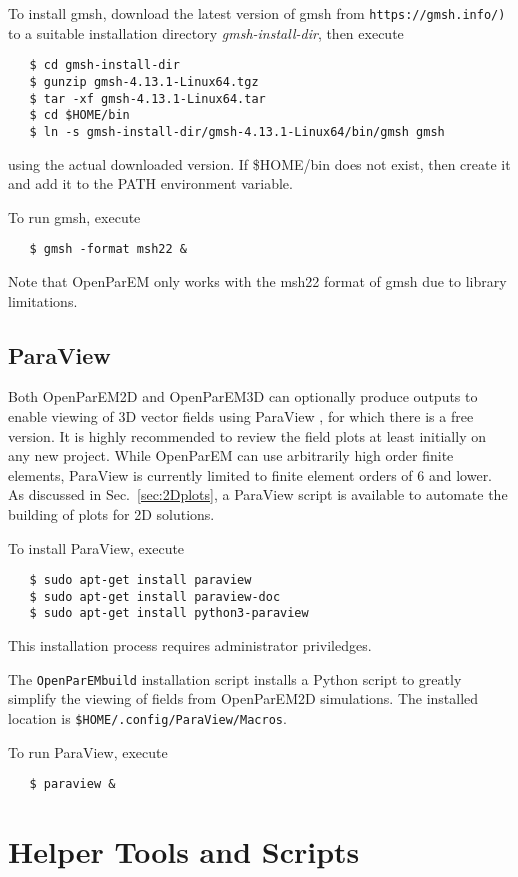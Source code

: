\documentclass[titlepage]{article}
\renewcommand\_{\textunderscore\linebreak[1]}
\begin{document}
To install gmsh, download the latest version of gmsh from \verb+https://gmsh.info/)+ to a suitable installation directory \textit{gmsh-install-dir},  then execute
\begin{verbatim}
   $ cd gmsh-install-dir
   $ gunzip gmsh-4.13.1-Linux64.tgz
   $ tar -xf gmsh-4.13.1-Linux64.tar
   $ cd $HOME/bin
   $ ln -s gmsh-install-dir/gmsh-4.13.1-Linux64/bin/gmsh gmsh
\end{verbatim}
using the actual downloaded version.  If \$HOME/bin does not exist, then create it and add it to the PATH environment variable.

To run gmsh, execute
\begin{verbatim}
   $ gmsh -format msh22 &
\end{verbatim}

\noindent Note that OpenParEM only works with the msh22 format of gmsh due to library limitations.

\subsection{ParaView}
\label{sec:paraview}

Both OpenParEM2D and OpenParEM3D can optionally produce outputs to enable viewing of 3D vector fields using ParaView \cite{paraview}, for which there is a free version. It is highly recommended to review the field plots at least initially on any new project.  While OpenParEM can use arbitrarily high order finite elements, ParaView is currently limited to finite element orders of 6 and lower.  As discussed in Sec.~\ref{sec:2Dplots}, a ParaView script is available to automate the building of plots for 2D solutions.

To install ParaView, execute
\begin{verbatim}
   $ sudo apt-get install paraview
   $ sudo apt-get install paraview-doc
   $ sudo apt-get install python3-paraview
\end{verbatim}
\noindent This installation process requires administrator priviledges.

The \texttt{OpenParEM\_build} installation script installs a Python script to greatly simplify the viewing of fields from OpenParEM2D simulations.  The installed location is \texttt{\$HOME/.config/ParaView/Macros}.

To run ParaView, execute
\begin{verbatim}
   $ paraview &
\end{verbatim}

\section{Helper Tools and Scripts}
\end{document}

